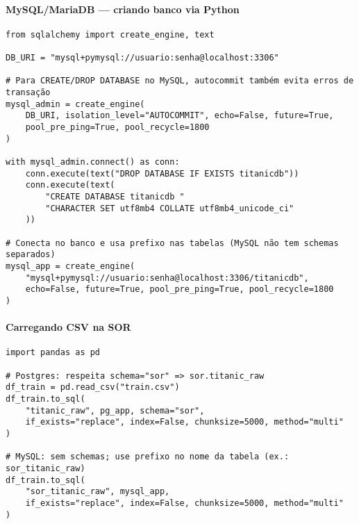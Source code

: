 \documentclass[12pt,a4paper]{article}
\begin{document}
\paragraph{MySQL/MariaDB — criando banco via Python}
\begin{verbatim}
from sqlalchemy import create_engine, text

DB_URI = "mysql+pymysql://usuario:senha@localhost:3306"

# Para CREATE/DROP DATABASE no MySQL, autocommit também evita erros de transação
mysql_admin = create_engine(
    DB_URI, isolation_level="AUTOCOMMIT", echo=False, future=True,
    pool_pre_ping=True, pool_recycle=1800
)

with mysql_admin.connect() as conn:
    conn.execute(text("DROP DATABASE IF EXISTS titanicdb"))
    conn.execute(text(
        "CREATE DATABASE titanicdb "
        "CHARACTER SET utf8mb4 COLLATE utf8mb4_unicode_ci"
    ))

# Conecta no banco e usa prefixo nas tabelas (MySQL não tem schemas separados)
mysql_app = create_engine(
    "mysql+pymysql://usuario:senha@localhost:3306/titanicdb",
    echo=False, future=True, pool_pre_ping=True, pool_recycle=1800
)
\end{verbatim}

\paragraph{Carregando CSV na SOR}
\begin{verbatim}
import pandas as pd

# Postgres: respeita schema="sor" => sor.titanic_raw
df_train = pd.read_csv("train.csv")
df_train.to_sql(
    "titanic_raw", pg_app, schema="sor",
    if_exists="replace", index=False, chunksize=5000, method="multi"
)

# MySQL: sem schemas; use prefixo no nome da tabela (ex.: sor_titanic_raw)
df_train.to_sql(
    "sor_titanic_raw", mysql_app,
    if_exists="replace", index=False, chunksize=5000, method="multi"
)
\end{verbatim}
\end{document}
